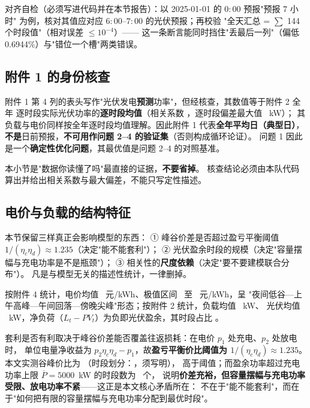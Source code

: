 \begin{guideblock}
对齐自检（必须写进代码并在本节报告）：以 2025-01-01 的 \(0{:}00\) 预报"预报 7 小时"
为例，核对其值应对应 \(6{:}00\)--\(7{:}00\) 的光伏预报；再校验
"全天汇总 = \(\sum\) 144 个时段值"（相对误差 \(\le 10^{-4}\)）——
这一条断言能同时挡住"丢最后一列"（偏低 0.6944\%）与"错位一个槽"两类错误。
\end{guideblock}

\subsection{附件 1 的身份核查}

附件 1 第 4 列的表头写作"光伏发电\textbf{预测}功率"，但经核查，其数值等于附件 2 全年
逐时段实际光伏功率的\textbf{逐时段均值}（相关系数 \ph，逐时段偏差最大值 \ph~kW）；
其负载与电价同样按全年逐时段均值理解。因此附件 1 代表\textbf{全年平均日（典型日）}，
\textbf{不是}日前预报，\textbf{不可用作问题 2--4 的验证集}（否则构成循环论证）。
问题 1 因此是一个\textbf{确定性优化问题}，其最优值是问题 2--4 的对照基准。

\begin{guideblock}
本小节是"数据你读懂了吗"最直接的证据，\textbf{不要省掉}。
核查结论必须由本队代码算出并给出相关系数与最大偏差，不能只写定性描述。
\end{guideblock}

\subsection{电价与负载的结构特征}

\begin{guideblock}
本节保留三样真正会影响模型的东西：
① 峰谷价差是否超过盈亏平衡阈值 \(1/(\eta_c\eta_d)\approx 1.235\)（决定"能不能套利"）；
② 光伏盈余时段的规模（决定"容量摆幅与充电功率是不是瓶颈"）；
③ 相关性的\textbf{尺度依赖}（决定"要不要建模联合分布"）。
凡是与模型无关的描述性统计，一律删掉。
\end{guideblock}

按附件 4 统计，电价均值 \ph~元/kWh、极值区间 \ph~至 \ph~元/kWh，呈
"夜间低谷—上午高峰—午间回落—傍晚尖峰"形态；按附件 2 统计，负载均值 \ph~kW、
光伏均值 \ph~kW，净负荷（\(L_t-PV_t\)）为负即光伏盈余，其时段占比 \ph。

套利是否有利取决于峰谷价差能否覆盖往返损耗：在电价 \(p_1\) 处充电、\(p_2\) 处放电时，
单位电量净收益为 \(p_2\eta_c\eta_d-p_1\)，故\textbf{盈亏平衡价比阈值为
\(1/(\eta_c\eta_d)\approx 1.235\)}。本文实测谷峰价比为 \ph（时段划分：\ph，须写明），
高于阈值；而盈余功率超过充电功率上限 \(\overline P=5000\)~kW 的时段数为 \ph~个，
说明\textbf{价差充裕，但容量摆幅与充电功率受限、放电功率不紧}——这正是本文核心矛盾所在：
不在于"能不能套利"，而在于"如何把有限的容量摆幅与充电功率分配到最优时段"。

